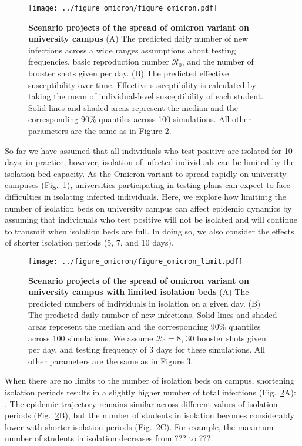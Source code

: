 \documentclass[12pt]{article}
\newcommand{\fref}[1]{Fig.~\ref{fig:#1}}
\begin{document}
\begin{figure}[!th]
\texttt{[image: ../figure\_omicron/figure\_omicron.pdf]}
\caption{
\textbf{Scenario projects of the spread of omicron variant on university campus}
(A) The predicted daily number of new infections across a wide ranges assumptions about testing frequencies, basic reproduction number $\mathcal R_0$, and the number of booster shots given per day.
(B) The predicted effective susceptibility over time. 
Effective susceptibility is calculated by taking the mean of individual-level susceptibility of each student.
Solid lines and shaded areas represent the median and the corresponding 90\% quantiles across 100 simulations.
All other parameters are the same as in Figure 2.
\label{fig:omicron}
}
\end{figure}

So far we have assumed that all individuals who test positive are isolated for 10 days;
in practice,  however, isolation of infected individuals can be limited by the isolation bed capacity.
As the Omicron variant to spread rapidly on university campuses (\fref{omicron}), universities participating in testing plans can expect to face difficulties in isolating infected individuals.
Here, we explore how limitintg the number of isolation beds on university campus can affect epidemic dynamics by assuming that individuals who test positive will not be isolated and will continue to transmit when isolation beds are full.
In doing so, we also consider the effects of shorter isolation periods (5, 7, and 10 days).

\begin{figure}[!th]
\texttt{[image: ../figure\_omicron/figure\_omicron\_limit.pdf]}
\caption{
\textbf{Scenario projects of the spread of omicron variant on university campus with limited isolation beds}
(A) The predicted numbers of individuals in isolation on a given day.
(B) The predicted daily number of new infections.
Solid lines and shaded areas represent the median and the corresponding 90\% quantiles across 100 simulations.
We assume $\mathcal R_0 = 8$, 30 booster shots given per day, and testing frequency of 3 days for these simulations.
All other parameters are the same as in Figure 3.
\label{fig:isolation}
}
\end{figure}

When there are no limits to the number of isolation beds on campus, shortening isolation periods results in a slightly higher number of total infections (\fref{isolation}A): .
The epidemic trajectory remains similar across different values of isolation periods (\fref{isolation}B), but the number of students in isolation becomes considerably lower with shorter isolation periods (\fref{isolation}C).
For example, the maximum number of students in isolation decreases from ??? to ???.
\end{document}
